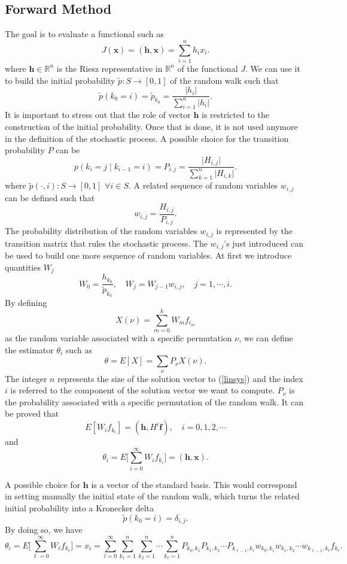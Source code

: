 \subsection{Forward Method}

The goal is to evaluate a functional such as
\[
J(\mathbf{x})=(\mathbf{h},\mathbf{x})=\sum_{i=1}^n h_i x_i.
\]
where $\mathbf{h}\in \mathbb{R}^n$ is the Riesz representative in
$\mathbb{R}^n$ of the functional $J$.
We can use it to build the initial probability $\tilde{p}:
S\rightarrow [0,1]$ of the random walk such that
\[
\tilde{p}(k_0=i)=\tilde{p}_{k_0}=\frac{\lvert h_i\rvert}{\sum_{i=1}^n \lvert
h_i\rvert}.
\]
It is important to stress out that the role of vector $\mathbf{h}$ is
restricted to the construction of the initial probability. Once that is done,
it is
not used anymore in the definition of the stochastic process.
A possible choice for the transition probability $P$ can be
\[
p(k_i=j \;\lvert\;k_{i-1}=i )=P_{i,j}=\frac{\lvert H_{i,j}\rvert}{\sum_{k=1}^n
\lvert H_{i,k}\rvert}.
\]
where $\tilde{p}(\cdot,i):S\rightarrow [0,1]$ $\forall i\in S$.
A related sequence of random variables $w_{i,j}$ can be defined
such that
\[
w_{i,j}=\frac{H_{i,j}}{P_{i,j}}.
\]
The probability distribution of the random variables $w_{i,j}$ is represented
by the transition matrix that rules the stochastic process. The $w_{i,j}$'s
just introduced can be used to build one more sequence
of random variables.
At first we introduce quantities $W_j$
\[
W_{0}=\frac{h_{k_0}}{\tilde{p}_{k_0}}, \quad W_j=W_{j-1} w_{i,j}, \quad
j=1,\cdots, i.
\]
By defining
\[
X(\nu)=\sum_{m=0}^k W_m f_{i_m}
\]
as the random variable associated with a specific permutation $\nu$, we can
define the estimator $\theta_i$ such as
\[
\theta=E[X]=\sum_{\nu}P_{\nu}X(\nu).
\]
The integer $n$ represents the size of the solution vector to (\ref{linsys})
and
the
index
$i$
is referred to the component of the solution vector we want to compute.
$P_{\nu}$ is the probability associated with a specific permutation of the
random walk.
It can be proved that
\[
E[W_i f_{k_i}]=(\mathbf{h},H^i\mathbf{f}), \quad i=0,1,2,\cdots
\]
and
\[
\theta_i=E\bigg[\sum_{i=0}^\infty W_i f_{k_i}\bigg]=(\mathbf{h},\mathbf{x}).
\]

A possible choice for $\mathbf{h}$ is a vector of the standard basis. This
would correspond in setting manually the initial state of the random walk,
which turns the related initial probability into a Kronecker delta
\[
\tilde{p}(k_0=i)=\delta_{i,j}.
\]
By doing so, we have
\begin{equation}
\theta_i=E\bigg[\sum_{\ell=0}^\infty W_{\ell}
f_{k_{\ell}}\bigg]=x_i=\sum_{l=0}^\infty
\sum_{k_1=1}^{n}\sum_{k_2=1}^n\cdots \sum_{k_{\ell}=1}^n
P_{k_0,k_1}P_{k_1,k_2}\cdots P_{k_{\ell-1},
k_{\ell}}w_{k_0,k_1}w_{k_1,k_2}\cdots
w_{k_{\ell-1}, k_{\ell}}f_{k_{\ell}}.
\label{dir_mean}
\end{equation}


